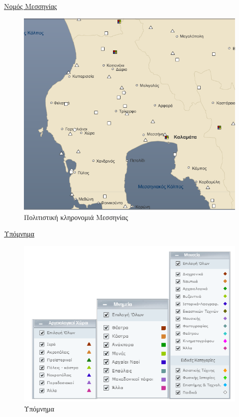 \documentclass[12pt]{article}
\begin{document}
	\underline{Νομός Μεσσηνίας}
	
	\begin{figure} [H]
		\begin{center}
			\includegraphics [scale = 0.60] {messinia2.png}
			\caption{Πολιτιστική κληρονομιά Μεσσηνίας}
		\end{center}
	\end{figure}

	\underline{Υπόμνημα}
	
	\begin{figure} [H]
		\begin{center}
			\includegraphics [scale = 0.60] {ypomnima.png}
			\caption{Υπόμνημα}
		\end{center}
	\end{figure}
\end{document}
